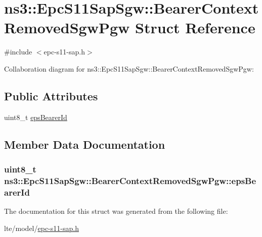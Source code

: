 \hypertarget{structns3_1_1EpcS11SapSgw_1_1BearerContextRemovedSgwPgw}{}\section{ns3\+:\+:Epc\+S11\+Sap\+Sgw\+:\+:Bearer\+Context\+Removed\+Sgw\+Pgw Struct Reference}
\label{structns3_1_1EpcS11SapSgw_1_1BearerContextRemovedSgwPgw}


{\ttfamily \#include $<$epc-\/s11-\/sap.\+h$>$}



Collaboration diagram for ns3\+:\+:Epc\+S11\+Sap\+Sgw\+:\+:Bearer\+Context\+Removed\+Sgw\+Pgw\+:
\subsection*{Public Attributes}
\begin{DoxyCompactItemize}
\item 
uint8\+\_\+t \hyperlink{structns3_1_1EpcS11SapSgw_1_1BearerContextRemovedSgwPgw_ab51e5ce1e9da089614febb871c39985e}{eps\+Bearer\+Id}
\end{DoxyCompactItemize}


\subsection{Member Data Documentation}
\subsubsection[{\texorpdfstring{eps\+Bearer\+Id}{epsBearerId}}]{\setlength{\rightskip}{0pt plus 5cm}uint8\+\_\+t ns3\+::\+Epc\+S11\+Sap\+Sgw\+::\+Bearer\+Context\+Removed\+Sgw\+Pgw\+::eps\+Bearer\+Id}\hypertarget{structns3_1_1EpcS11SapSgw_1_1BearerContextRemovedSgwPgw_ab51e5ce1e9da089614febb871c39985e}{}\label{structns3_1_1EpcS11SapSgw_1_1BearerContextRemovedSgwPgw_ab51e5ce1e9da089614febb871c39985e}


The documentation for this struct was generated from the following file\+:\begin{DoxyCompactItemize}
\item 
lte/model/\hyperlink{epc-s11-sap_8h}{epc-\/s11-\/sap.\+h}\end{DoxyCompactItemize}
